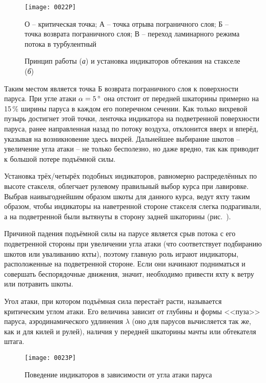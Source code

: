 \begin{figure*}[!htb]
  \centering
  \texttt{[image: 0022P]}
  \caption{Принцип работы (\textit{а}) и установка индикаторов обтекания на стакселе (\textit{б})}
  \label{fig:22}
  \small
  \centering{}
  О \--- критическая точка; А \--- точка отрыва пограничного слоя; Б \--- точка возврата пограничного слоя; В \--- переход ламинарного режима потока в турбулентный
\end{figure*}

Таким местом является точка Б возврата пограничного слоя к поверхности паруса. При угле атаки $\alpha = 5\,^\circ$ она отстоит от передней шкаторины примерно на 15\,\% ширины паруса в каждом его поперечном сечении. Как только вихревой пузырь достигнет этой точки, ленточка индикатора на подветренной поверхности паруса, ранее направленная назад по потоку воздуха, отклонится вверх и вперёд, указывая на возникновение здесь вихрей. Дальнейшее выбирание шкотов \--- увеличение угла атаки \--- не только бесполезно, но даже вредно, так как приводит к большой потере подъёмной силы.

Установка трёх\-/четырёх подобных индикаторов, равномерно распределённых по высоте стакселя, облегчает рулевому правильный выбор курса при лавировке. Выбрав наивыгоднейшим образом шкоты для данного курса, ведут яхту таким образом, чтобы индикаторы на наветренной стороне стакселя слегка подрагивали, а на подветренной были вытянуты в сторону задней шкаторины (рис.~).
 
Причиной падения подъёмной силы на парусе является срыв потока с его подветренной стороны при увеличении угла атаки (что соответствует подбиранию шкотов или уваливанию яхты), поэтому главную роль играют индикаторы, расположенные на подветренной стороне. Если они начинают подниматься и совершать беспорядочные движения, значит, необходимо привести яхту к ветру или потравить шкоты.

Угол атаки, при котором подъёмная сила перестаёт расти, называется критическим углом атаки. Его величина зависит от глубины и формы <<пуза>> паруса, аэродинамического удлинения $\lambda$ (оно для парусов вычисляется так же, как и для килей и рулей), наличия у передней шкаторины мачты или обтекателя штага.

\begin{figure*}[!htb]
  \centering
  \texttt{[image: 0023P]}
  \caption{Поведение индикаторов в зависимости от угла атаки паруса}
  \label{fig:23}
\end{figure*}

